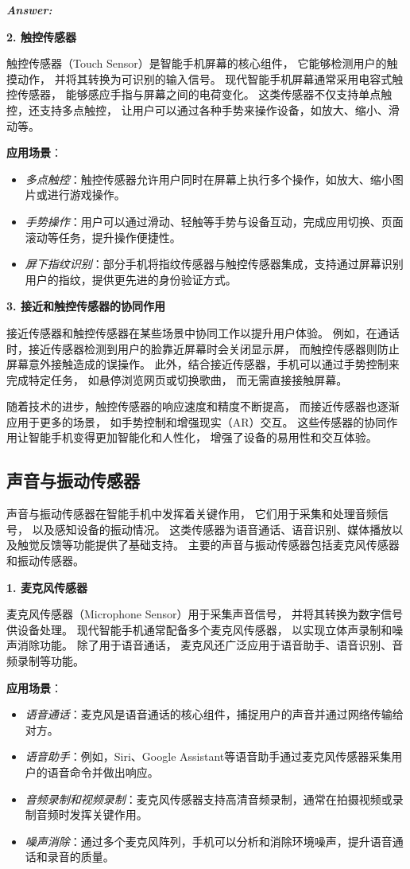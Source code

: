 \documentclass[12pt]{article}
\newenvironment{Answer}{
  \vspace{12pt}
  {\large\textbf{\textit{\hspace{-12pt}Answer:}}}\par
  \vspace{8pt}
} {\vspace{24pt}}
\begin{document}
\begin{Answer}
\noindent\textbf{2. 触控传感器}\noindent

触控传感器（Touch Sensor）是智能手机屏幕的核心组件，
它能够检测用户的触摸动作，
并将其转换为可识别的输入信号。
现代智能手机屏幕通常采用电容式触控传感器，
能够感应手指与屏幕之间的电荷变化。
这类传感器不仅支持单点触控，还支持多点触控，
让用户可以通过各种手势来操作设备，如放大、缩小、滑动等。

\textbf{应用场景}：
\begin{itemize}
    \item \textit{多点触控}：触控传感器允许用户同时在屏幕上执行多个操作，如放大、缩小图片或进行游戏操作。
    \item \textit{手势操作}：用户可以通过滑动、轻触等手势与设备互动，完成应用切换、页面滚动等任务，提升操作便捷性。
    \item \textit{屏下指纹识别}：部分手机将指纹传感器与触控传感器集成，支持通过屏幕识别用户的指纹，提供更先进的身份验证方式。
\end{itemize}

\noindent\textbf{3. 接近和触控传感器的协同作用}\noindent

接近传感器和触控传感器在某些场景中协同工作以提升用户体验。
例如，在通话时，接近传感器检测到用户的脸靠近屏幕时会关闭显示屏，
而触控传感器则防止屏幕意外接触造成的误操作。
此外，结合接近传感器，手机可以通过手势控制来完成特定任务，
如悬停浏览网页或切换歌曲，
而无需直接接触屏幕。

随着技术的进步，触控传感器的响应速度和精度不断提高，
而接近传感器也逐渐应用于更多的场景，
如手势控制和增强现实（AR）交互。
这些传感器的协同作用让智能手机变得更加智能化和人性化，
增强了设备的易用性和交互体验。

\subsection*{声音与振动传感器}\noindent

声音与振动传感器在智能手机中发挥着关键作用，
它们用于采集和处理音频信号，
以及感知设备的振动情况。
这类传感器为语音通话、语音识别、媒体播放以及触觉反馈等功能提供了基础支持。
主要的声音与振动传感器包括麦克风传感器和振动传感器。

\noindent\textbf{1. 麦克风传感器}\noindent

麦克风传感器（Microphone Sensor）用于采集声音信号，
并将其转换为数字信号供设备处理。
现代智能手机通常配备多个麦克风传感器，
以实现立体声录制和噪声消除功能。
除了用于语音通话，
麦克风还广泛应用于语音助手、语音识别、音频录制等功能。

\textbf{应用场景}：
\begin{itemize}
    \item \textit{语音通话}：麦克风是语音通话的核心组件，捕捉用户的声音并通过网络传输给对方。
    \item \textit{语音助手}：例如，Siri、Google Assistant等语音助手通过麦克风传感器采集用户的语音命令并做出响应。
    \item \textit{音频录制和视频录制}：麦克风传感器支持高清音频录制，通常在拍摄视频或录制音频时发挥关键作用。
    \item \textit{噪声消除}：通过多个麦克风阵列，手机可以分析和消除环境噪声，提升语音通话和录音的质量。
\end{itemize}


\end{Answer}
\end{document}
